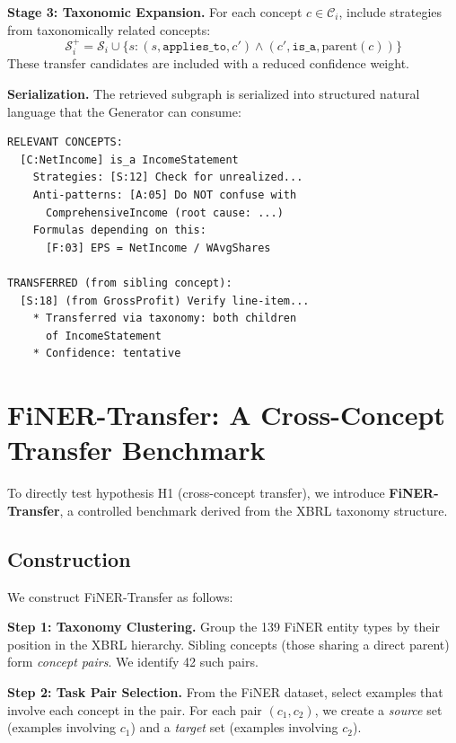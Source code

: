 \documentclass[12pt,a4paper]{article}
\begin{document}
\textbf{Stage 3: Taxonomic Expansion.} For each concept $c \in \mathcal{C}_i$, include strategies from taxonomically related concepts:
\begin{equation}
\mathcal{S}_i^+ = \mathcal{S}_i \cup \{s : (s, \texttt{applies\_to}, c') \land (c', \texttt{is\_a}, \text{parent}(c))\}
\end{equation}
These transfer candidates are included with a reduced confidence weight.

\textbf{Serialization.} The retrieved subgraph is serialized into structured natural language that the Generator can consume:

\begin{verbatim}
RELEVANT CONCEPTS:
  [C:NetIncome] is_a IncomeStatement
    Strategies: [S:12] Check for unrealized...
    Anti-patterns: [A:05] Do NOT confuse with
      ComprehensiveIncome (root cause: ...)
    Formulas depending on this:
      [F:03] EPS = NetIncome / WAvgShares

TRANSFERRED (from sibling concept):
  [S:18] (from GrossProfit) Verify line-item...
    * Transferred via taxonomy: both children
      of IncomeStatement
    * Confidence: tentative
\end{verbatim}


\section{FiNER-Transfer: A Cross-Concept Transfer Benchmark}
\label{sec:finer-transfer}

To directly test hypothesis H1 (cross-concept transfer), we introduce \textbf{FiNER-Transfer}, a controlled benchmark derived from the XBRL taxonomy structure.

\subsection{Construction}

We construct FiNER-Transfer as follows:

\textbf{Step 1: Taxonomy Clustering.} Group the 139 FiNER entity types by their position in the XBRL hierarchy. Sibling concepts (those sharing a direct parent) form \textit{concept pairs}. We identify 42 such pairs.

\textbf{Step 2: Task Pair Selection.} From the FiNER dataset, select examples that involve each concept in the pair. For each pair $(c_1, c_2)$, we create a \textit{source} set (examples involving $c_1$) and a \textit{target} set (examples involving $c_2$).
\end{document}
